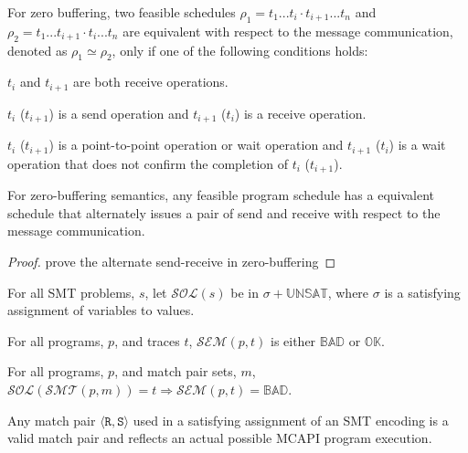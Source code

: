 \begin{definition}
For zero buffering, two feasible schedules $\rho_1 = t_1...t_i\cdot t_{i+1}...t_n$ and $\rho_2 = t_1...t_{i+1}\cdot t_i...t_n$ are equivalent with respect to the message communication, denoted as $\rho_1 \simeq \rho_2$, only if one of the following conditions holds:
\begin{compactenum} 
\item $t_i$ and $t_{i+1}$ are both receive operations.
\item $t_i$ ($t_{i+1}$) is a send operation and $t_{i+1}$ ($t_i$) is a receive operation.
\item $t_i$ ($t_{i+1}$) is a point-to-point operation or wait operation and $t_{i+1}$ ($t_i$) is a wait operation that does not confirm the completion of $t_i$ ($t_{i+1}$).
\end{compactenum}
\end{definition}

\begin{lemma}
For zero-buffering semantics, any feasible program schedule has a equivalent schedule that alternately issues a pair of send and receive with respect to the message communication. 
\end{lemma}

\begin{proof}
prove the alternate send-receive in zero-buffering
\end{proof}

\begin{definition}
For all SMT problems, $s$, let $\mathcal{SOL}(s)$ be in $\sigma +
\mathbb{UNSAT}$, where $\sigma$ is a satisfying assignment of
variables to values.
\end{definition}

\begin{definition}[Semantics]
For all programs, $p$, and traces $t$, $\mathcal{SEM}(p, t)$ is either
$\mathbb{BAD}$ or $\mathbb{OK}$.
\end{definition}

\begin{theorem}[Soundness]
For all programs, $p$, and match pair sets, $m$,
$\mathcal{SOL}(\mathcal{SMT}(p, m)) = t \Rightarrow \mathcal{SEM}(p, t) =
\mathbb{BAD}$.
\end{theorem}


\begin{lemma} \label{lem:bogus}
Any match pair $\langle \mathtt{R}, \mathtt{S}\rangle$ used in a
satisfying assignment of an SMT encoding is a valid match pair and
reflects an actual possible MCAPI program execution.
\end{lemma}

